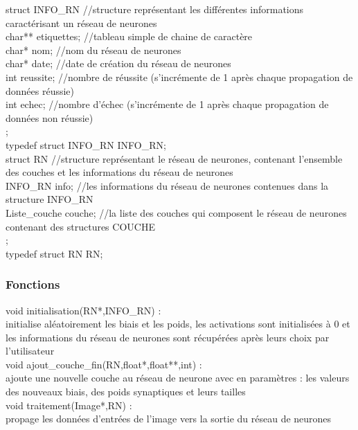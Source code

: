 \documentclass{article}
\begin{document}
			
			struct INFO_RN	//structure représentant les différentes informations caractérisant un réseau de neurones\\
			{
				char** etiquettes;	//tableau simple de chaine de caractère\\
				char* nom;	//nom du réseau de neurones\\
				char* date;	//date de création du réseau de neurones\\
				int reussite;	//nombre de réussite (s'incrémente de 1 après chaque propagation de données réussie)\\
				int echec;	//nombre d'échec (s'incrémente de 1 après chaque propagation de données non réussie)\\
			};\\
			typedef struct INFO_RN INFO_RN;\\
			
			struct RN	//structure représentant le réseau de neurones, contenant l'ensemble des couches et les informations du réseau de neurones\\
			{
				INFO_RN info;	//les informations du réseau de neurones contenues dans la structure INFO_RN\\
				Liste_couche couche;	//la liste des couches qui composent le réseau de neurones contenant des structures COUCHE\\
			};\\
			typedef struct RN RN;\\
			
		\subsubsection{Fonctions}
			void initialisation(RN*,INFO_RN) :\\
				initialise aléatoirement les biais et les poids, les activations sont initialisées à 0 et les informations du réseau de neurones sont récupérées après leurs choix par l'utilisateur\\
			
			void ajout_couche_fin(RN,float*,float**,int) :\\
				ajoute une nouvelle couche au réseau de neurone avec en paramètres : les valeurs des nouveaux biais, des poids synaptiques et leurs tailles\\
			
			void traitement(Image*,RN) :\\
				propage les données d'entrées de l'image vers la sortie du réseau de neurones\\
				
\end{document}
